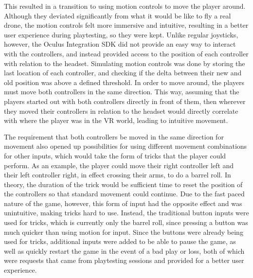 \documentclass[10pt,twocolumn]{article}
\begin{document}
This resulted in a transition to using motion controls to move the player around. Although they deviated significantly from what it would be like to fly a real drone, the motion controls felt more immersive and intuitive, resulting in a better user experience during playtesting, so they were kept. Unlike regular joysticks, however, the Oculus Integration SDK did not provide an easy way to interact with the controllers, and instead provided access to the position of each controller with relation to the headset. Simulating motion controls was done by storing the last location of each controller, and checking if the delta between their new and old position was above a defined threshold. In order to move around, the players must move both controllers in the same direction. This way, assuming that the players started out with both controllers directly in front of them, then wherever they moved their controllers in relation to the headset would directly correlate with where the player was in the VR world, leading to intuitive movement.

The requirement that both controllers be moved in the same direction for movement also opened up possibilities for using different movement combinations for other inputs, which would take the form of tricks that the player could perform. As an example, the player could move their right controller left and their left controller right, in effect crossing their arms, to do a barrel roll. In theory, the duration of the trick would be sufficient time to reset the position of the controllers so that standard movement could continue. Due to the fast paced nature of the game, however, this form of input had the opposite effect and was unintuitive, making tricks hard to use. Instead, the traditional button inputs were used for tricks, which is currently only the barrel roll, since pressing a button was much quicker than using motion for input. Since the buttons were already being used for tricks, additional inputs were added to be able to pause the game, as well as quickly restart the game in the event of a bad play or loss, both of which were requests that came from playtesting sessions and provided for a better user experience.
\end{document}
